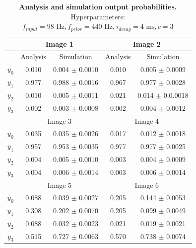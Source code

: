 \begin{table}[]
\centering
\label{tab:1DTrainingEvaluationC3}
\small
\tabcolsep=0.11cm
\begin{tabular}{|c|cc|cc|}
\hline
                       & \multicolumn{2}{c|}{Image 1}                       & \multicolumn{2}{c|}{Image 2}                       \\ \hline
                       & \multicolumn{1}{c|}{Analysis} & Simulation         & \multicolumn{1}{c|}{Analysis} & Simulation         \\ \hline
$y_0$                  & \multicolumn{1}{c|}{0.010}    & 0.004 $\pm$ 0.0010 & \multicolumn{1}{c|}{0.010}    & 0.005 $\pm$ 0.0009 \\ \hline
$y_1$                  & \multicolumn{1}{c|}{0.977}    & 0.988 $\pm$ 0.0016 & \multicolumn{1}{c|}{0.967}    & 0.977 $\pm$ 0.0028 \\ \hline
$y_2$                  & \multicolumn{1}{c|}{0.010}    & 0.005 $\pm$ 0.0011 & \multicolumn{1}{c|}{0.021}    & 0.014 $\pm$ 0.0.0018 \\ \hline
$y_3$                  & \multicolumn{1}{c|}{0.002}    & 0.003 $\pm$ 0.0008 & \multicolumn{1}{c|}{0.002}    & 0.004 $\pm$ 0.0012 \\ \hline
                       & \multicolumn{2}{c|}{Image 3}                       & \multicolumn{2}{c|}{Image 4}                       \\ \hline
$y_0$                  & \multicolumn{1}{c|}{0.035}    & 0.035 $\pm$ 0.0026 & \multicolumn{1}{c|}{0.017}    & 0.012 $\pm$ 0.0018 \\ \hline
$y_1$                  & \multicolumn{1}{c|}{0.957}    & 0.953 $\pm$ 0.0035 & \multicolumn{1}{c|}{0.977}    & 0.977 $\pm$ 0.0025 \\ \hline
$y_2$                  & \multicolumn{1}{c|}{0.004}    & 0.005 $\pm$ 0.0010 & \multicolumn{1}{c|}{0.003}    & 0.004 $\pm$ 0.0009 \\ \hline
$y_3$                  & \multicolumn{1}{c|}{0.004}    & 0.006 $\pm$ 0.0014 & \multicolumn{1}{c|}{0.003}    & 0.006 $\pm$ 0.0014 \\ \hline
						& \multicolumn{2}{c|}{Image 5}                       & \multicolumn{2}{c|}{Image 6}                       \\ \hline
$y_0$                  & \multicolumn{1}{c|}{0.088}    & 0.039 $\pm$ 0.0027 & \multicolumn{1}{c|}{0.205}    & 0.144 $\pm$ 0.0053 \\ \hline
$y_1$                  & \multicolumn{1}{c|}{0.308}    & 0.202 $\pm$ 0.0070 & \multicolumn{1}{c|}{0.205}    & 0.099 $\pm$ 0.0049 \\ \hline
$y_2$                  & \multicolumn{1}{c|}{0.088}    & 0.032 $\pm$ 0.0023 & \multicolumn{1}{c|}{0.021}    & 0.019 $\pm$ 0.0021 \\ \hline
$y_3$                  & \multicolumn{1}{c|}{0.515}    & 0.727 $\pm$ 0.0063 & \multicolumn{1}{c|}{0.570}    & 0.738 $\pm$ 0.0074 \\ \hline
\end{tabular}
\caption{\textbf{Analysis and simulation output probabilities. } Hyperparameters: $f_{input} = 98\text{ Hz}, f_{prior} = 440\text{ Hz}, \tau_{decay} = 4\text{ ms}, c = 3$}
\end{table}

